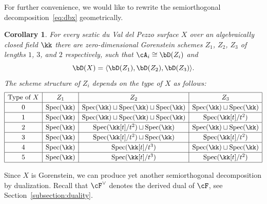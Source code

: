 \documentclass[11pt]{amsart}
\DeclareMathOperator{\Spec}{\mathrm{Spec}}
\theoremstyle{plain}
\newtheorem{corollary}[theorem]{Corollary}
\theoremstyle{definition}
\theoremstyle{remark}
\begin{document}
For further convenience, we would like to rewrite the semiorthogonal decomposition~\eqref{eq:dbx} geometrically.

\begin{corollary}
\label{corollary:dbx-z2-z3}
For every sextic du Val del Pezzo surface $X$ over an algebraically closed field $\kk$ there are 
zero-dimensional Gorenstein schemes $Z_1$, $Z_2$, $Z_3$ of lengths $1$, $3$, and $2$ respectively, such that $\cA_i \cong \bD(Z_i)$ and
\begin{equation}
\label{eq:dbx-dz}
\bD(X) = \langle \bD(Z_1), \bD(Z_2), \bD(Z_3) \rangle.
\end{equation}
The scheme structure of $Z_i$ depends on the type of $X$ as follows:
\begin{equation*}\def\arraystretch{1.2}%
\begin{array}{|c|c|c|c|}
\hline
\text{Type of $X$} & Z_1 & Z_2 & Z_3 \\
\hline 
0 & \Spec(\kk) & \Spec(\kk) \sqcup \Spec(\kk) \sqcup \Spec(\kk) & \Spec(\kk) \sqcup \Spec(\kk) \\
\hline
1 & \Spec(\kk) & \Spec(\kk) \sqcup \Spec(\kk) \sqcup \Spec(\kk) & \Spec(\kk[t]/t^2) \\
\hline
2 & \Spec(\kk) & \Spec(\kk[t]/t^2) \sqcup \Spec(\kk) & \Spec(\kk)  \sqcup \Spec(\kk) \\
\hline
3 & \Spec(\kk) & \Spec(\kk[t]/t^2) \sqcup \Spec(\kk) & \Spec(\kk[t]/t^2) \\
\hline
4 & \Spec(\kk) & \Spec(\kk[t]/t^3) & \Spec(\kk)  \sqcup \Spec(\kk) \\
\hline
5 & \Spec(\kk) & \Spec(\kk[t]/t^3) & \Spec(\kk[t]/t^2) \\
\hline
\end{array}
\end{equation*}
\end{corollary}

Since $X$ is Gorenstein, we can produce yet another semiorthogonal decomposition by dualization.
Recall that $\cF^\vee$ denotes the derived dual of $\cF$, see Section~\ref{subsection:duality}.
\end{document}
